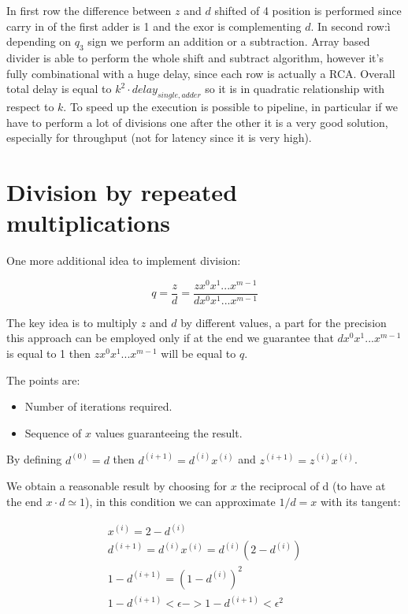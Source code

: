 In first row the difference between $z$ and $d$ shifted of 4 position is performed since carry in of the first adder is 1 and the exor is complementing $d$. In second row:ì depending on $q_3$ sign we perform an addition or a subtraction.
Array based divider is able to perform the whole shift and subtract algorithm, however it's fully combinational with a huge delay, since each row is actually a RCA. Overall total delay is equal to $k^2 \cdot delay_{single,adder}$ so it is in quadratic relationship with respect to $k$. To speed up the execution is possible to pipeline, in particular if we have to perform a lot of divisions one after the other it is a very good solution, especially for throughput (not for latency since it is very high).

\section{Division by repeated multiplications}

One more additional idea to implement division:

$$q=\frac{z}{d}=\frac{z x^{0} x^{1}... x^{m-1}}{d x^{0} x^{1}... x^{m-1}}$$

The key idea is to multiply $z$ and $d$ by different values, a part for the precision this approach can be employed only if at the end we guarantee that $d x^{0} x^{1}... x^{m-1}$ is equal to 1 then $z x^{0} x^{1}... x^{m-1}$ will be equal to $q$.

The points are:
\begin{itemize}
  \item Number of iterations required.
  \item Sequence of $x$ values guaranteeing the result.
\end{itemize}

By defining $d^{(0)}=d$ then $d^{(i+1)}=d^{(i)}x^{(i)}$ and $z^{(i+1)}=z^{(i)}x^{(i)}$.

We obtain a reasonable result by choosing for $x$ the reciprocal of d (to have at the end $x \cdot d \simeq 1$), in this condition we can approximate $1/d=x$ with its tangent:

\begin{eqnarray}
x^{(i)}=2-d^{(i)}\\
d^{(i+1)}=d^{(i)} x^{(i)}=d^{(i)}(2-d^{(i)})\\
1-d^{(i+1)}=(1-d^{(i)})^2\\
1-d^{(i+1)} < \epsilon -> 1-d^{(i+1)} < \epsilon^2
\end{eqnarray}

